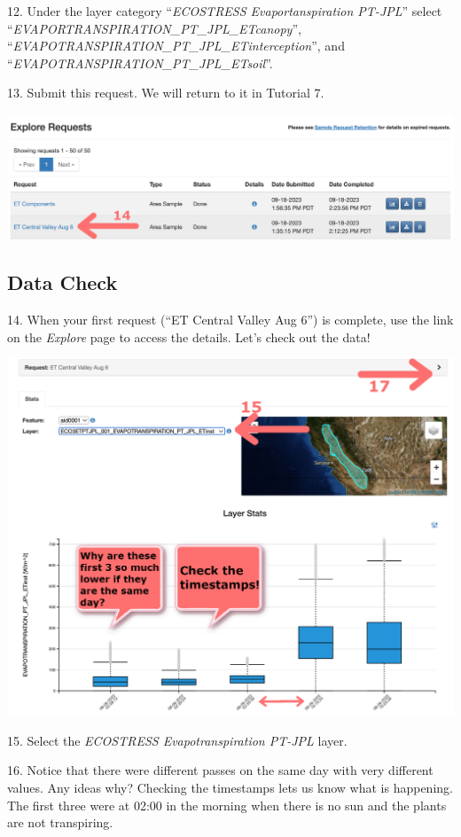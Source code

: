 \documentclass[oneside,a4paper,11pt,explicit]{book}
\begin{document}
\vspace{.5em}

12. Under the layer category ``\textit{ECOSTRESS Evaportanspiration PT-JPL}'' select ``\textit{EVAPORTRANSPIRATION\_PT\_JPL\_ETcanopy}'', ``\textit{EVAPOTRANSPIRATION\_PT\_JPL\_ETinterception}'', and ``\textit{EVAPOTRANSPIRATION\_PT\_JPL\_ETsoil}''.

13. Submit this request. We will return to it in Tutorial 7.

\vspace{.5em}

\centerline{\includegraphics[width=.6\textwidth]{ExploreComplete.png}}

\vspace{.5em}

\subsection{Data Check}

14. When your first request (``ET Central Valley Aug 6'') is complete, use the link on the \textit{Explore} page to access the details. Let's check out the data!

\vspace{.5em}

\centerline{\includegraphics[width=.6\textwidth]{ETinstDataCheck.png}}

\vspace{.5em}

15. Select the \textit{ECOSTRESS Evapotranspiration PT-JPL} layer.

16. Notice that there were different passes on the same day with very different values. Any ideas why? Checking the timestamps lets us know what is happening. The first three were at 02:00 in the morning when there is no sun and the plants are not transpiring.
\end{document}
